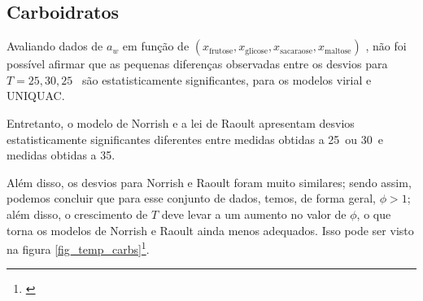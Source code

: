 \documentclass[
	12pt,				%
	openright,
	twoside,
	a4paper,			%
	brazil,			%
	french,				%
	spanish,			%
	english				%
	]{abntex2}
\begin{document}
\subsection{Carboidratos}

Avaliando dados de $a_w$ em função de $(x_\text{frutose},x_\text{glicose},%
x_\text{sacaraose},x_\text{maltose})$ \cite{velezmoro2000}, não foi possível
afirmar que as pequenas diferenças observadas entre os desvios para
$T=25,30,25$ \textcelsius\ são estatisticamente significantes, para
os modelos virial e UNIQUAC.

Entretanto, o modelo de Norrish e a lei de Raoult apresentam desvios
estatisticamente significantes diferentes entre medidas obtidas a
25\textcelsius\ ou 30\textcelsius\ e medidas obtidas a 35\textcelsius.

Além disso, os desvios para Norrish e Raoult foram muito similares; sendo
assim, podemos concluir que para esse conjunto de dados, temos, de forma
geral, $\phi>1$; além disso, o crescimento de $T$ deve levar a um aumento
no valor de $\phi$, o que torna os modelos de Norrish e Raoult ainda menos
adequados. Isso pode ser visto na figura \ref{fig_temp_carbs}\footnote{%
\cite{velezmoro2000}}.
\end{document}
